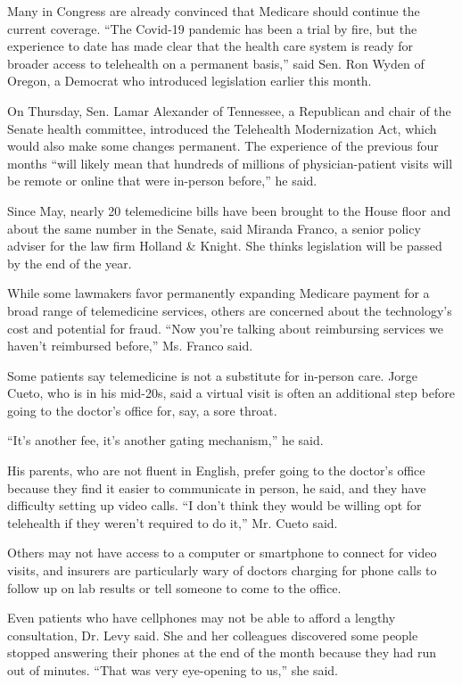 Many in Congress are already convinced that Medicare should continue the
current coverage. ``The Covid-19 pandemic has been a trial by fire, but
the experience to date has made clear that the health care system is
ready for broader access to telehealth on a permanent basis,'' said Sen.
Ron Wyden of Oregon, a Democrat who introduced legislation earlier this
month.

On Thursday, Sen. Lamar Alexander of Tennessee, a Republican and chair
of the Senate health committee, introduced the Telehealth Modernization
Act, which would also make some changes permanent. The experience of the
previous four months ``will likely mean that hundreds of millions of
physician-patient visits will be remote or online that were in-person
before,'' he said.

Since May, nearly 20 telemedicine bills have been brought to the House
floor and about the same number in the Senate, said Miranda Franco, a
senior policy adviser for the law firm Holland \& Knight. She thinks
legislation will be passed by the end of the year.

While some lawmakers favor permanently expanding Medicare payment for a
broad range of telemedicine services, others are concerned about the
technology's cost and potential for fraud. ``Now you're talking about
reimbursing services we haven't reimbursed before,'' Ms. Franco said.

Some patients say telemedicine is not a substitute for in-person care.
Jorge Cueto, who is in his mid-20s, said a virtual visit is often an
additional step before going to the doctor's office for, say, a sore
throat.

``It's another fee, it's another gating mechanism,'' he said.

His parents, who are not fluent in English, prefer going to the doctor's
office because they find it easier to communicate in person, he said,
and they have difficulty setting up video calls. ``I don't think they
would be willing opt for telehealth if they weren't required to do it,''
Mr. Cueto said.

Others may not have access to a computer or smartphone to connect for
video visits, and insurers are particularly wary of doctors charging for
phone calls to follow up on lab results or tell someone to come to the
office.

Even patients who have cellphones may not be able to afford a lengthy
consultation, Dr. Levy said. She and her colleagues discovered some
people stopped answering their phones at the end of the month because
they had run out of minutes. ``That was very eye-opening to us,'' she
said.

